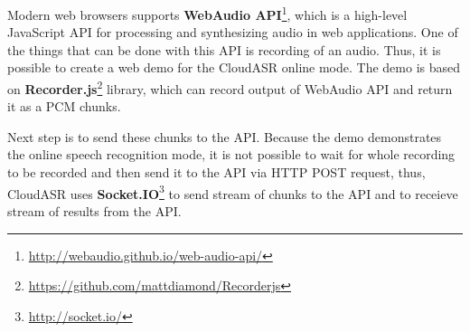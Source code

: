 Modern web browsers supports \textbf{WebAudio API}\footnote{\url{http://webaudio.github.io/web-audio-api/}},
  which is a high-level JavaScript API for processing and synthesizing audio in web applications.
One of the things that can be done with this API is recording of an audio.
Thus, it is possible to create a web demo for the CloudASR online mode.
The demo is based on \textbf{Recorder.js}\footnote{\url{https://github.com/mattdiamond/Recorderjs}} library,
  which can record output of WebAudio API and return it as a PCM chunks.

Next step is to send these chunks to the API.
Because the demo demonstrates the online speech recognition mode,
  it is not possible to wait for whole recording to be recorded and then send it to the API via HTTP POST request,
  thus, CloudASR uses \textbf{Socket.IO}\footnote{\url{http://socket.io/}} to send stream of chunks to the API
  and to receieve stream of results from the API.
